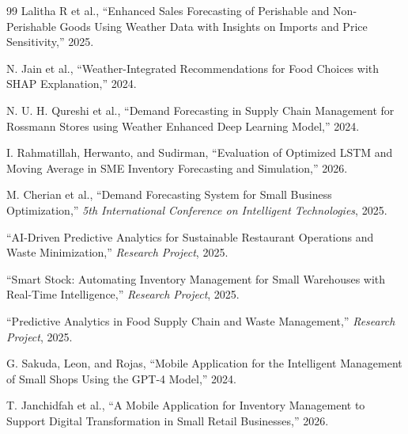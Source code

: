 \documentclass[conference]{IEEEtran}
\begin{document}
\begin{thebibliography}{99}
Lalitha R et al., ``Enhanced Sales Forecasting of Perishable and
Non-Perishable Goods Using Weather Data with Insights on Imports and
Price Sensitivity,'' 2025.

N. Jain et al., ``Weather-Integrated Recommendations for Food Choices
with SHAP Explanation,'' 2024.

N. U. H. Qureshi et al., ``Demand Forecasting in Supply Chain Management
for Rossmann Stores using Weather Enhanced Deep Learning Model,'' 2024.

I. Rahmatillah, Herwanto, and Sudirman, ``Evaluation of Optimized LSTM
and Moving Average in SME Inventory Forecasting and Simulation,'' 2026.

M. Cherian et al., ``Demand Forecasting System for Small Business Optimization,'' \emph{5th International Conference on Intelligent Technologies}, 2025.

``AI-Driven Predictive Analytics for Sustainable Restaurant Operations and Waste Minimization,'' \emph{Research Project}, 2025.

``Smart Stock: Automating Inventory Management for Small Warehouses with Real-Time Intelligence,'' \emph{Research Project}, 2025.

``Predictive Analytics in Food Supply Chain and Waste Management,'' \emph{Research Project}, 2025.

G. Sakuda, Leon, and Rojas, ``Mobile Application for the Intelligent
Management of Small Shops Using the GPT-4 Model,'' 2024.

T. Janchidfah et al., ``A Mobile Application for Inventory Management
to Support Digital Transformation in Small Retail Businesses,'' 2026.

\end{thebibliography}
\end{document}
